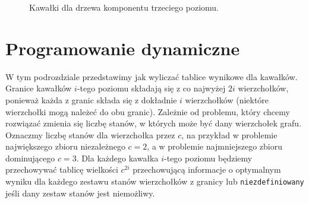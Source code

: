 \documentclass[twoside,a4paper,12pt]{report} %
\theoremstyle{break}
\begin{document}
\begin{figure}[ht]
    \centering
    
    \caption{Kawałki dla drzewa komponentu trzeciego poziomu.}
    \label{kawałki}
\end{figure}

\section{Programowanie dynamiczne} \label{sekcja_3.3}
W tym podrozdziale przedstawimy jak wyliczać tablice wynikowe dla kawałków. Granice kawałków $i$-tego poziomu składają się z co najwyżej $2i$ wierzchołków, ponieważ każda z granic składa się z dokładnie $i$ wierzchołków (niektóre wierzchołki mogą należeć do obu granic). Zależnie od problemu, który chcemy rozwiązać zmienia się liczbę stanów, w których może być dany wierzchołek grafu. Oznaczmy liczbę stanów dla wierzchołka przez $c$, na przykład w problemie największego zbioru niezależnego $c=2$, a w problemie najmniejszego zbioru dominującego $c=3$. Dla każdego kawałka $i$-tego poziomu będziemy przechowywać tablicę wielkości $c^{2i}$ przechowującą informacje o optymalnym wyniku dla każdego zestawu stanów wierzchołków z granicy lub \texttt{niezdefiniowany} jeśli dany zestaw stanów jest niemożliwy.
 
\end{document}
